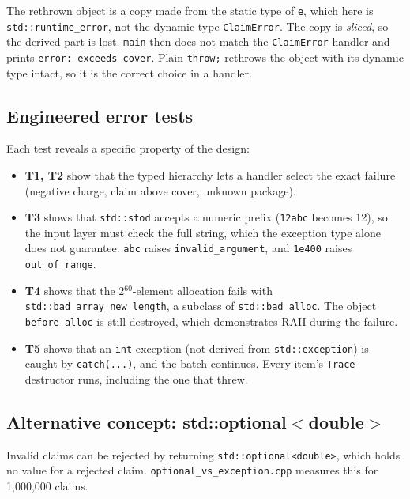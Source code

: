 \documentclass[11pt,a4paper]{article}
\newcommand{\lstout}[2]{}
\begin{document}
The rethrown object is a copy made from the static type of \texttt{e}, which here is \texttt{std::runtime\_error}, not the dynamic type \texttt{ClaimError}. The copy is \emph{sliced}, so the derived part is lost. \texttt{main} then does not match the \texttt{ClaimError} handler and prints \texttt{error: exceeds cover}. Plain \texttt{throw;} rethrows the object with its dynamic type intact, so it is the correct choice in a handler.

\subsection*{Engineered error tests}
\lstout{../Task04_ErrorHandling/error_tests.out}{Output of the engineered error tests}

\noindent Each test reveals a specific property of the design:
\begin{itemize}[nosep]
\item \textbf{T1, T2} show that the typed hierarchy lets a handler select the exact failure (negative charge, claim above cover, unknown package).
\item \textbf{T3} shows that \texttt{std::stod} accepts a numeric prefix (\texttt{12abc} becomes 12), so the input layer must check the full string, which the exception type alone does not guarantee. \texttt{abc} raises \texttt{invalid\_argument}, and \texttt{1e400} raises \texttt{out\_of\_range}.
\item \textbf{T4} shows that the 2$^{60}$-element allocation fails with \texttt{std::bad\_array\_new\_length}, a subclass of \texttt{std::bad\_alloc}. The object \texttt{before-alloc} is still destroyed, which demonstrates RAII during the failure.
\item \textbf{T5} shows that an \texttt{int} exception (not derived from \texttt{std::exception}) is caught by \texttt{catch(...)}, and the batch continues. Every item's \texttt{Trace} destructor runs, including the one that threw.
\end{itemize}

\subsection*{Alternative concept: std::optional$<$double$>$}
Invalid claims can be rejected by returning \texttt{std::optional<double>}, which holds no value for a rejected claim. \texttt{optional\_vs\_exception.cpp} measures this for 1{,}000{,}000 claims.

\lstout{../Task04_ErrorHandling/optional_vs_exception.out}{Measured optional versus exception, 1,000,000 claims (-O2, median of 5)}
\end{document}

